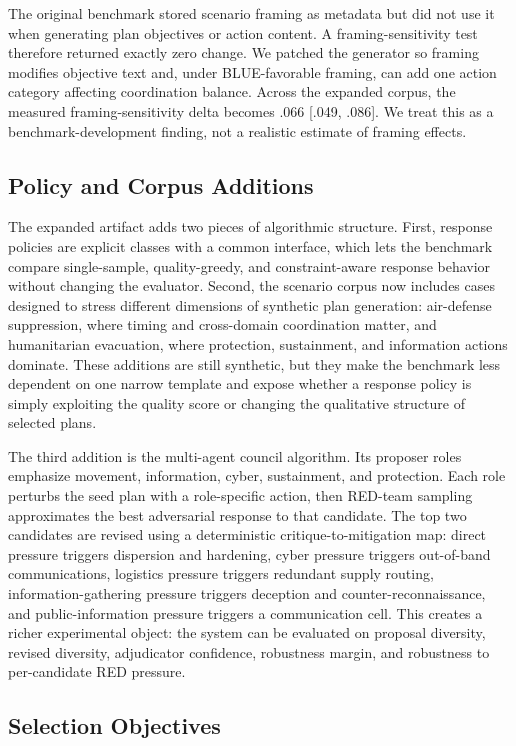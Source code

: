 \documentclass[letterpaper]{article} %
\begin{document}
The original benchmark stored scenario framing as metadata but did not use it when generating plan objectives or action content. A framing-sensitivity test therefore returned exactly zero change. We patched the generator so framing modifies objective text and, under BLUE-favorable framing, can add one action category affecting coordination balance. Across the expanded corpus, the measured framing-sensitivity delta becomes .066 [.049, .086]. We treat this as a benchmark-development finding, not a realistic estimate of framing effects.

\subsection{Policy and Corpus Additions}

The expanded artifact adds two pieces of algorithmic structure. First, response policies are explicit classes with a common interface, which lets the benchmark compare single-sample, quality-greedy, and constraint-aware response behavior without changing the evaluator. Second, the scenario corpus now includes cases designed to stress different dimensions of synthetic plan generation: air-defense suppression, where timing and cross-domain coordination matter, and humanitarian evacuation, where protection, sustainment, and information actions dominate. These additions are still synthetic, but they make the benchmark less dependent on one narrow template and expose whether a response policy is simply exploiting the quality score or changing the qualitative structure of selected plans.

The third addition is the multi-agent council algorithm. Its proposer roles emphasize movement, information, cyber, sustainment, and protection. Each role perturbs the seed plan with a role-specific action, then RED-team sampling approximates the best adversarial response to that candidate. The top two candidates are revised using a deterministic critique-to-mitigation map: direct pressure triggers dispersion and hardening, cyber pressure triggers out-of-band communications, logistics pressure triggers redundant supply routing, information-gathering pressure triggers deception and counter-reconnaissance, and public-information pressure triggers a communication cell. This creates a richer experimental object: the system can be evaluated on proposal diversity, revised diversity, adjudicator confidence, robustness margin, and robustness to per-candidate RED pressure.

\subsection{Selection Objectives}
\end{document}
